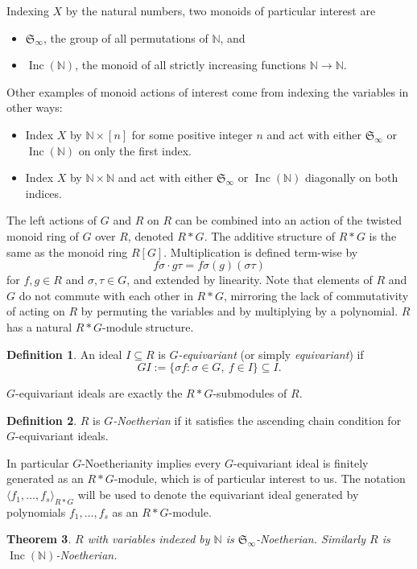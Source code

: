 \documentclass[10pt]{amsart}
\newtheorem{theorem}{Theorem}[section]
\theoremstyle{definition}
\newtheorem{definition}[theorem]{Definition}
\theoremstyle{remark}
\numberwithin{equation}{section}
\newcommand{\B}[1]{\mathbb #1}
\newcommand{\F}[1]{\mathfrak #1}
\newcommand{\<}{\langle}
\renewcommand{\>}{\rangle}
\newcommand{\ideal}[1]{\langle #1 \rangle}
\newcommand{\Inc}{\operatorname{Inc}(\B N)}
\begin{document}
Indexing $X$ by the natural numbers, two monoids of particular interest are
\begin{itemize}
 \item ${\mathfrak S}_{\infty}$, the group of all permutations of $\B N$, and
 \item $\Inc$, the monoid of all strictly increasing functions $\B N \to \B N$.
\end{itemize}
Other examples of monoid actions of interest come from indexing the variables in other ways:
\begin{itemize}
 \item Index $X$ by $\B N \times [n]$ for some positive integer $n$ and act with either $\F S_\infty$ or $\Inc$ on only the first index.
 \item Index $X$ by $\B N \times \B N$ and act with either $\F S_\infty$ or $\Inc$ diagonally on both indices.
\end{itemize}


The left actions of $G$ and $R$ on $R$ can be combined into an action of the twisted monoid ring of $G$ over $R$, denoted $R*G$.  The additive structure of $R*G$ is the same as the monoid ring $R[G]$.  Multiplication is defined term-wise by
 \[ f\sigma\cdot g\tau = f\sigma(g)(\sigma\tau) \]
for $f,g\in R$ and $\sigma,\tau\in G$, and extended by linearity.  Note that elements of $R$ and $G$ do not commute with each other in $R*G$, mirroring the lack of commutativity of acting on $R$ by permuting the variables and by multiplying by a polynomial.  $R$ has a natural $R*G$-module structure.

\begin{definition}
 An ideal $I \subseteq R$ is $G$\textit{-equivariant}
(or simply \textit{equivariant}) if \[ GI := \{\sigma f
: \sigma \in G, \ f \in I\} \subseteq I.\]
\end{definition}
$G$-equivariant ideals are exactly the $R*G$-submodules of $R$.

\begin{definition}
$R$ is $G${\em -Noetherian} if it satisfies the ascending chain condition for $G$-equivariant ideals.
\end{definition}
In particular $G$-Noetherianity implies every $G$-equivariant ideal is finitely generated as an $R*G$-module, which is of particular interest to us.  The notation $\ideal{f_1,\ldots,f_s}_{R*G}$ will be used to denote the equivariant ideal generated by polynomials $f_1,\ldots,f_s$ as an $R*G$-module.

\begin{theorem}\label{onevarfinitegenthm}
$R$ with variables indexed by $\B N$ is $\F S_\infty$-Noetherian.  Similarly $R$ is $\Inc$-Noetherian.
\end{theorem}
\end{document}
